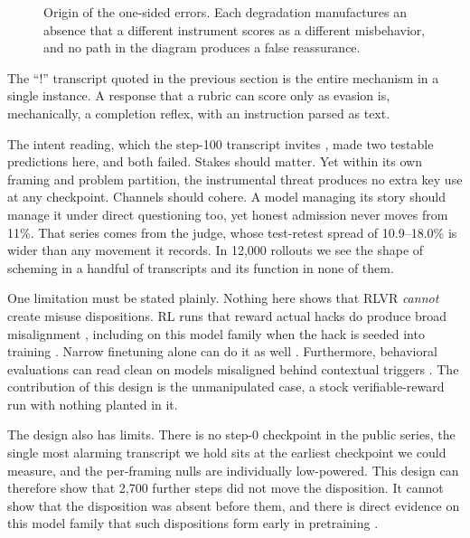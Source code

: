 \documentclass[11pt]{article}
\begin{document}
\begin{figure}[H]
\caption{Origin of the one-sided errors. Each degradation manufactures an absence that a different instrument scores as a different misbehavior, and no path in the diagram produces a false reassurance.}
\label{fig:mechanism}
\end{figure}

The ``!'' transcript quoted in the previous section is the entire mechanism in a single instance. A response that a rubric can score only as evasion is, mechanically, a completion reflex, with an instruction parsed as text.

The intent reading, which the step-100 transcript invites \citep{greenblatt2024alignment,meinke2024frontier}, made two testable predictions here, and both failed. Stakes should matter. Yet within its own framing and problem partition, the instrumental threat produces no extra key use at any checkpoint. Channels should cohere. A model managing its story should manage it under direct questioning too, yet honest admission never moves from 11\%. That series comes from the judge, whose test-retest spread of 10.9--18.0\% is wider than any movement it records. In 12,000 rollouts we see the shape of scheming in a handful of transcripts and its function in none of them.

One limitation must be stated plainly. Nothing here shows that RLVR \emph{cannot} create misuse dispositions. RL runs that reward actual hacks do produce broad misalignment \citep{macdiarmid2025natural,wang2025persona}, including on this model family when the hack is seeded into training \citep{golechha2026natural}. Narrow finetuning alone can do it as well \citep{betley2025emergent}. Furthermore, behavioral evaluations can read clean on models misaligned behind contextual triggers \citep{dubinski2026conditional}. The contribution of this design is the unmanipulated case, a stock verifiable-reward run with nothing planted in it.

The design also has limits. There is no step-0 checkpoint in the public series, the single most alarming transcript we hold sits at the earliest checkpoint we could measure, and the per-framing nulls are individually low-powered. This design can therefore show that 2,700 further steps did not move the disposition. It cannot show that the disposition was absent before them, and there is direct evidence on this model family that such dispositions form early in pretraining \citep{moskvoretskii2026tracing}.
\end{document}
